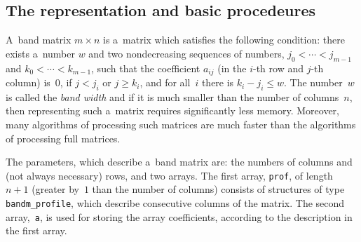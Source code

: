 \subsection{\label{ssect:band:basic}The representation and basic procedeures}

A~band matrix $m\times n$ is a~matrix which satisfies the following condition:
there exists a~number $w$ and two nondecreasing sequences of numbers,
$j_0<\cdots<j_{m-1}$ and $k_0<\cdots<k_{m-1}$, such that the coefficient
$a_{ij}$ (in the $i$-th row and $j$-th column) is~$0$, if $j<j_i$ or $j\geq k_i$,
and for all~$i$ there is $k_i-j_i\leq w$. The number~$w$ is called the
\emph{band width} and if it is much smaller than the number of columns~$n$,
then representing such a~matrix requires significantly less memory.
Moreover, many algorithms of processing such matrices are much faster
than the algorithms of processing full matrices.

\vspace{\bigskipamount}

The parameters, which describe a~band matrix are:
the numbers of columns and (not always necessary) rows, and two arrays.
The first array, \texttt{prof}, of length $n+1$ (greater by~$1$ than
the number of columns) consists of structures of type
\texttt{bandm\_profile}, which describe consecutive columns
of the matrix. The second array,~\texttt{a}, is used for storing the
array coefficients, according to the description in the first array.

